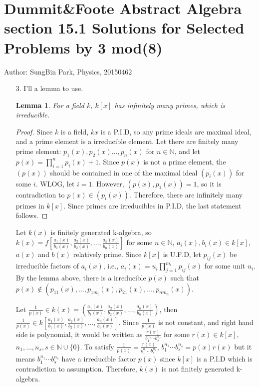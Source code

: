 \documentclass[12pt]{article}
\newtheorem{lemma}{Lemma}
\begin{document}
\section*{Dummit\&Foote Abstract Algebra section 15.1 Solutions for Selected Problems by 3 mod(8)}
Author: SungBin Park, Physics, 20150462
\begin{enumerate}
\item[3.] I'll a lemma to use.
\begin{lemma}
For a field $k$, $k[x]$ has infinitely many primes, which is irreducible.
\end{lemma}
\begin{proof}
Since $k$ is a field, $k{x}$ is a P.I.D, so any prime ideals are maximal ideal, and a prime element is a irreducible element. Let there are finitely many prime element: $p_1(x),p_2(x)\ldots, p_n(x)$ for $n\in \mathbb{N}$, and let $p(x)=\prod_{i=1}^n p_i(x)+1$. Since $p(x)$ is not a prime element, the $(p(x))$ should be contained in one of the maximal ideal $(p_i(x))$ for some $i$. WLOG, let $i=1$. However, $(p(x),p_1(x))=1$, so it is contradiction to $p(x)\in (p_i(x))$. Therefore, there are infinitely many primes in $k[x]$. Since primes are irreducibles in P.I.D, the last statement follows.
\end{proof}
Let $k(x)$ is finitely generated k-algebra, so $k(x)=f\left[\frac{a_1(x)}{b_1(x)},\frac{a_2(x)}{b_2(x)},\ldots, \frac{a_n(x)}{b_n(x)}\right]$ for some $n\in \mathbb{N}$, $a_i(x),b_i(x)\in k[x]$, $a(x)$ and $b(x)$ relatively prime. Since $k[x]$ is U.F.D, let $p_{ij}(x)$ be irreducible factors of $a_i(x)$, i.e., $a_i(x)=u_i\prod_{j=1}^{m_i}p_{ij}(x)$ for some unit $u_i$. By the lemma above, there is a irreducible $p(x)$ such that $p(x)\notin (p_{11}(x), \ldots, p_{1m_i}(x),p_{21}(x),\ldots, p_{nm_n}(x))$.

Let $\frac{1}{p(x)}\in k(x)=\left(\frac{a_1(x)}{b_1(x)},\frac{a_2(x)}{b_2(x)},\ldots, \frac{a_n(x)}{b_n(x)}\right)$, then $\frac{1}{p(x)}\in k\left[\frac{a_1(x)}{b_1(x)},\frac{a_2(x)}{b_2(x)},\ldots, \frac{a_n(x)}{b_n(x)}\right]$. Since $\frac{1}{p(x)}$ is not constant, and right hand side is polynomial, it would be written as $\frac{r(x)}{b_1^{n_1}\cdots b_s^{n_s}}$ for some $r(x)\in k[x]$, $n_1, \ldots,n_s, s\in \mathbb{N}\cup \{0\}$. To satisfy $\frac{1}{p(x)}=\frac{r(x)}{b_1^{n_1}\cdots b_s^{n_s}}$, $b_1^{n_1}\cdots b_s^{n_s}=p(x)r(x)$ but it means $b_1^{n_1}\cdots b_s^{n_s}$ have a irreducible factor $p(x)$ since $k[x]$ is a P.I.D which is contradiction to assumption. Therefore, $k(x)$ is not finitely generated k-algebra.


\end{enumerate}
\end{document}

